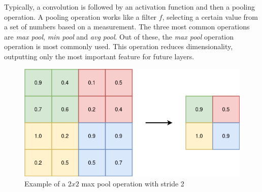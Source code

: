Typically, a convolution is followed by an activation function and then a pooling operation. A pooling operation works like a filter $f$, selecting a certain value from a set of numbers based on a measurement. The three most common operations are \textit{max pool}, \textit{min pool} and \textit{avg pool}. Out of these, the \textit{max pool} operation operation is most commonly used. This operation reduces dimensionality, outputting only the most important feature for future layers. \\

\begin{figure}[!h]
    \centering
    \includegraphics[scale=0.4]{figures/pooling.png}
    \caption{Example of a $2 x 2$ max pool operation with stride 2}
    \label{fig:maxpool}
\end{figure}